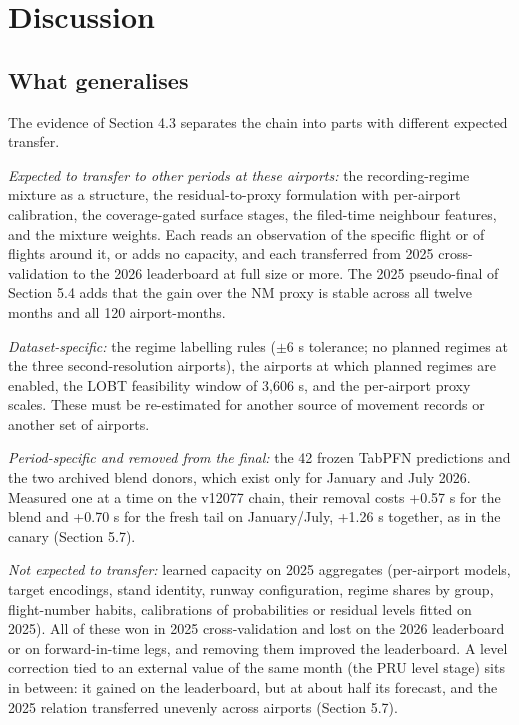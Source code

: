 \documentclass[
  manuscript=article,  %
  layout=preprint,     %
  year=2026,
  volume=4,
]{extra/joas}
\begin{document}
\section{Discussion}\label{discussion}

\subsection{What generalises}\label{what-generalises}

The evidence of Section 4.3 separates the chain into parts with different expected transfer.

\emph{Expected to transfer to other periods at these airports:} the recording-regime mixture as a structure, the residual-to-proxy formulation with per-airport calibration, the coverage-gated surface stages, the filed-time neighbour features, and the mixture weights. Each reads an observation of the specific flight or of flights around it, or adds no capacity, and each transferred from 2025 cross-validation to the 2026 leaderboard at full size or more. The 2025 pseudo-final of Section 5.4 adds that the gain over the NM proxy is stable across all twelve months and all 120 airport-months.

\emph{Dataset-specific:} the regime labelling rules ($\pm$6 s tolerance; no planned regimes at the three second-resolution airports), the airports at which planned regimes are enabled, the LOBT feasibility window of 3,606 s, and the per-airport proxy scales. These must be re-estimated for another source of movement records or another set of airports.

\emph{Period-specific and removed from the final:} the 42 frozen TabPFN predictions and the two archived blend donors, which exist only for January and July 2026. Measured one at a time on the v12077 chain, their removal costs +0.57 s for the blend and +0.70 s for the fresh tail on January/July, +1.26 s together, as in the canary (Section 5.7).

\emph{Not expected to transfer:} learned capacity on 2025 aggregates (per-airport models, target encodings, stand identity, runway configuration, regime shares by group, flight-number habits, calibrations of probabilities or residual levels fitted on 2025). All of these won in 2025 cross-validation and lost on the 2026 leaderboard or on forward-in-time legs, and removing them improved the leaderboard. A level correction tied to an external value of the same month (the PRU level stage) sits in between: it gained on the leaderboard, but at about half its forecast, and the 2025 relation transferred unevenly across airports (Section 5.7).
\end{document}
